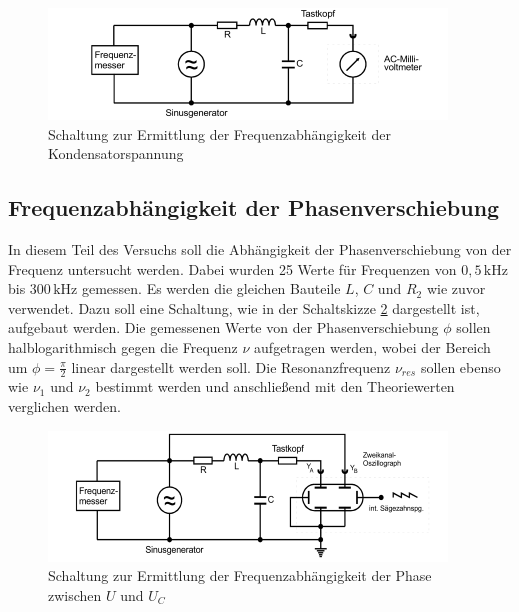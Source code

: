 \begin{figure}[H]
  \centering
  \includegraphics{content/aufgabeC.png}
  \caption{Schaltung zur Ermittlung der Frequenzabhängigkeit der Kondensatorspannung \cite{sample354}}
  \label{fig:gsk4}
\end{figure}


\subsection{Frequenzabhängigkeit der Phasenverschiebung}

In diesem Teil des Versuchs soll die Abhängigkeit der Phasenverschiebung von der Frequenz untersucht werden.
Dabei wurden 25 Werte für Frequenzen von $0,5\,\si{\kilo\hertz}$ bis $300\,\si{\kilo\hertz}$ gemessen. 
Es werden die gleichen Bauteile $L$, $C$ und $R_2$ wie zuvor verwendet.  
Dazu soll eine Schaltung, wie in der Schaltskizze \ref{fig:gsk5} dargestellt ist, aufgebaut werden.
Die gemessenen Werte von der Phasenverschiebung $\phi$ sollen halblogarithmisch gegen die Frequenz $\nu$
aufgetragen werden, wobei der Bereich um $\phi = \frac{\pi}{2}$ linear dargestellt werden soll.
Die Resonanzfrequenz $\nu_{res}$ sollen ebenso wie $\nu_1$ und $\nu_2$ bestimmt werden und anschließend
mit den Theoriewerten verglichen werden. 

\begin{figure}[H]
  \centering
  \includegraphics{content/aufgabeD.png}
  \caption{Schaltung zur Ermittlung der Frequenzabhängigkeit der Phase zwischen $U$ und $U_C$ \cite{sample354}}
  \label{fig:gsk5}
\end{figure}
